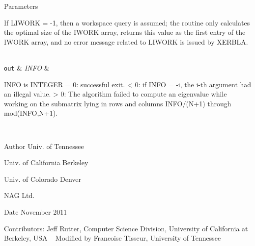 \begin{DoxyParams}[1]{Parameters}
\begin{DoxyVerb}
          If LIWORK = -1, then a workspace query is assumed; the
          routine only calculates the optimal size of the IWORK array,
          returns this value as the first entry of the IWORK array, and
          no error message related to LIWORK is issued by XERBLA.\end{DoxyVerb}
\\
\hline
\mbox{\tt out}  & {\em I\+N\+F\+O} & \begin{DoxyVerb}          INFO is INTEGER
          = 0:  successful exit.
          < 0:  if INFO = -i, the i-th argument had an illegal value.
          > 0:  The algorithm failed to compute an eigenvalue while
                working on the submatrix lying in rows and columns
                INFO/(N+1) through mod(INFO,N+1).\end{DoxyVerb}
 \\
\hline
\end{DoxyParams}
\begin{DoxyAuthor}{Author}
Univ. of Tennessee 

Univ. of California Berkeley 

Univ. of Colorado Denver 

N\+A\+G Ltd. 
\end{DoxyAuthor}
\begin{DoxyDate}{Date}
November 2011 
\end{DoxyDate}
\begin{DoxyParagraph}{Contributors\+: }
Jeff Rutter, Computer Science Division, University of California at Berkeley, U\+S\+A ~\newline
 Modified by Francoise Tisseur, University of Tennessee 
\end{DoxyParagraph}
